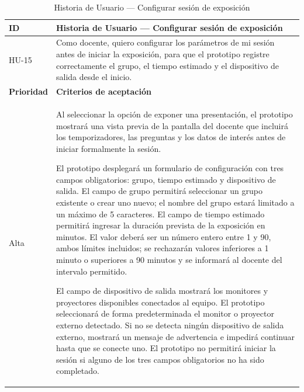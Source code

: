 \documentclass[11pt]{article}
\newcommand{\ttstyle}{%
  \small
  \setlength{\tabcolsep}{6pt}%
  \renewcommand{\arraystretch}{1.25}%
  \arrayrulecolor{azulprofundo}%
}
\newcommand{\hairrule}{%
  \arrayrulecolor{azulregla}\midrule[0.3pt]\arrayrulecolor{azulprofundo}%
}
\begin{document}
\begin{table}[H]
    \centering
    \renewcommand{\arraystretch}{1.2}
    \ttstyle
    \begin{tabular}{p{2.5cm}p{11cm}}
        \toprule
        \textbf{ID} & \textbf{Historia de Usuario --- Configurar sesión de exposición} \\
        \midrule
        HU-15 & Como docente, quiero configurar los parámetros de mi sesión antes de iniciar la exposición, para que el prototipo registre correctamente el grupo, el tiempo estimado y el dispositivo de salida desde el inicio. \\
        \hairrule
        \textbf{Prioridad} & \textbf{Criterios de aceptación} \\
        \hairrule
        Alta & Al seleccionar la opción de exponer una presentación, el prototipo mostrará una vista previa de la pantalla del docente que incluirá los temporizadores, las preguntas y los datos de interés antes de iniciar formalmente la sesión.

        El prototipo desplegará un formulario de configuración con tres campos obligatorios: grupo, tiempo estimado y dispositivo de salida. El campo de grupo permitirá seleccionar un grupo existente o crear uno nuevo; el nombre del grupo estará limitado a un máximo de 5 caracteres. El campo de tiempo estimado permitirá ingresar la duración prevista de la exposición en minutos. El valor deberá ser un número entero entre 1 y 90, ambos límites incluidos; se rechazarán valores inferiores a 1 minuto o superiores a 90 minutos y se informará al docente del intervalo permitido.

        El campo de dispositivo de salida mostrará los monitores y proyectores disponibles conectados al equipo. El prototipo seleccionará de forma predeterminada el monitor o proyector externo detectado. Si no se detecta ningún dispositivo de salida externo, mostrará un mensaje de advertencia e impedirá continuar hasta que se conecte uno. El prototipo no permitirá iniciar la sesión si alguno de los tres campos obligatorios no ha sido completado. \\
        \bottomrule
    \end{tabular}
    \caption{Historia de Usuario --- Configurar sesión de exposición}
    \label{tab:hu-configurar-sesion-exposicion}
\end{table}
\end{document}
